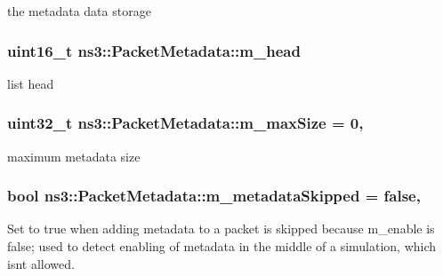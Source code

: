 the metadata data storage 

\subsubsection[{\texorpdfstring{m\+\_\+head}{m_head}}]{\setlength{\rightskip}{0pt plus 5cm}uint16\+\_\+t ns3\+::\+Packet\+Metadata\+::m\+\_\+head\hspace{0.3cm}{\ttfamily [private]}}\hypertarget{classns3_1_1PacketMetadata_a46b3ef0a9a80a798ad1e81b5694a5658}{}\label{classns3_1_1PacketMetadata_a46b3ef0a9a80a798ad1e81b5694a5658}


list head 

\subsubsection[{\texorpdfstring{m\+\_\+max\+Size}{m_maxSize}}]{\setlength{\rightskip}{0pt plus 5cm}uint32\+\_\+t ns3\+::\+Packet\+Metadata\+::m\+\_\+max\+Size = 0\hspace{0.3cm}{\ttfamily [static]}, {\ttfamily [private]}}\hypertarget{classns3_1_1PacketMetadata_a3816d0a0ab763831fd248b0b2693db1c}{}\label{classns3_1_1PacketMetadata_a3816d0a0ab763831fd248b0b2693db1c}


maximum metadata size 

\subsubsection[{\texorpdfstring{m\+\_\+metadata\+Skipped}{m_metadataSkipped}}]{\setlength{\rightskip}{0pt plus 5cm}bool ns3\+::\+Packet\+Metadata\+::m\+\_\+metadata\+Skipped = {\bf false}\hspace{0.3cm}{\ttfamily [static]}, {\ttfamily [private]}}\hypertarget{classns3_1_1PacketMetadata_ac370960e8881e5a7280122e9dc5f7ace}{}\label{classns3_1_1PacketMetadata_ac370960e8881e5a7280122e9dc5f7ace}
Set to true when adding metadata to a packet is skipped because m\+\_\+enable is false; used to detect enabling of metadata in the middle of a simulation, which isn\textquotesingle{}t allowed. 
